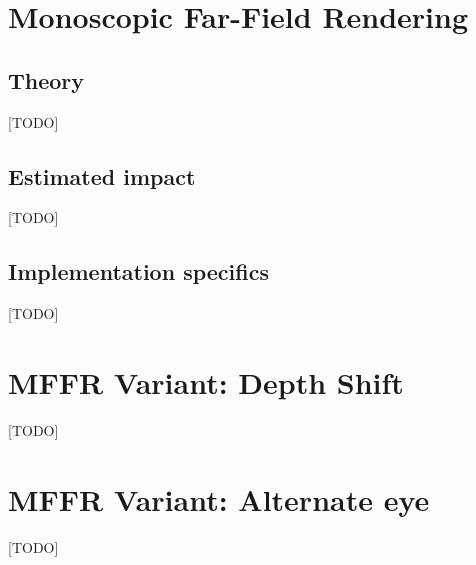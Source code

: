 
\section{Monoscopic Far-Field Rendering}
\subsection{Theory}
[TODO]
\subsection{Estimated impact}
[TODO]
\subsection{Implementation specifics}
[TODO]



\section{MFFR Variant: Depth Shift}
[TODO]

\section{MFFR Variant: Alternate eye}
[TODO]
